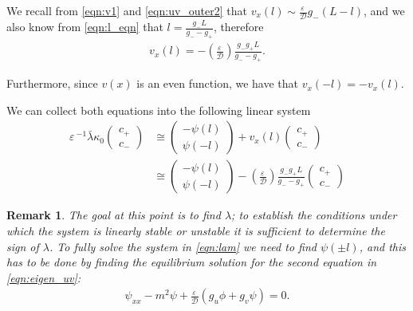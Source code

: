 \documentclass[a4paper,10pt]{article}
\newcommand{\lA}{\ensuremath{\lambda}}
\newcommand{\kA}{\ensuremath{\kappa}}
\newcommand{\Ep}{\ensuremath{\varepsilon\,}}
\newcommand{\DD}{\ensuremath{\mathcal{D}}}
\newtheorem{remark}{Remark}
\begin{document}
We recall from \eqref{eqn:v1} and \eqref{eqn:uv_outer2} that $v_x(l) \sim \frac{\Ep}{\DD}g_-(L-l)$, 
and we also know from \eqref{eqn:l_eqn} that $l = \frac{g_-L}{g_--g_+}$, therefore
% 
\begin{equation*}
\begin{split}
	v_x(l) = -\left(\frac{\Ep}{\DD}\right)\frac{g_-g_+L}{g_--g_+}.
\end{split}
\end{equation*}
% 

Furthermore, since $v(x)$ is an even function, we have that $v_x(-l) = -v_x(l)$.

We can collect both equations into the following linear system
% 
\begin{equation}
\label{eqn:lam}
	\begin{split}
	\Ep^{-1}\bar{\lA}\kA_0\begin{pmatrix}c_+\\c_-\end{pmatrix}
   &\cong
	\begin{pmatrix} -\psi(l) \\ \psi(-l) \end{pmatrix}
	 +v_x(l) \begin{pmatrix}c_+\\c_-\end{pmatrix}\\
   &\cong
	\begin{pmatrix} -\psi(l) \\ \psi(-l) \end{pmatrix}
	 - \left(\frac{\Ep}{\DD}\right)\frac{g_-g_+L}{g_--g_+}
	\begin{pmatrix}c_+\\c_-\end{pmatrix}
	\end{split}
\end{equation}
% 
\begin{remark}
The goal at this point is to find $\lA$; to establish the conditions under which the system is linearly stable or unstable it is sufficient to determine the sign of $\lA$. To fully solve the system in \eqref{eqn:lam} we need to find $\psi(\pm l)$, and this has to be done by finding the equilibrium solution for the second equation in \eqref{eqn:eigen_uv}:
% 
\begin{equation}
\label{eqn:psi_eq}
\begin{split}
	\psi_{xx} - m^2\psi + \frac{\Ep}{\DD}(g_u\phi + g_v\psi)=0.
\end{split}
\end{equation}
% 
\end{remark}
\end{document}
